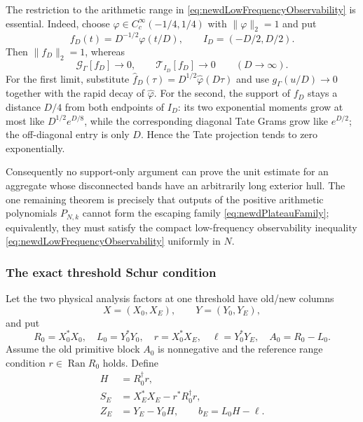 The restriction to the arithmetic range in
\eqref{eq:newdLowFrequencyObservability} is essential.  Indeed, choose
$\varphi\in C_c^\infty(-1/4,1/4)$ with $\|\varphi\|_2=1$ and put
\begin{equation}\label{eq:newdPlateauFamily}
 f_D(t)=D^{-1/2}\varphi(t/D),
 \qquad I_D=(-D/2,D/2).
\end{equation}
Then $\|f_D\|_2=1$, whereas
\begin{equation}\label{eq:newdPlateauEscape}
 \mathcal G_\Gamma[f_D]\longrightarrow0,
 \qquad
 \mathcal T_{I_D}[f_D]\longrightarrow0
 \qquad(D\to\infty).
\end{equation}
For the first limit, substitute
$\widehat f_D(\tau)=D^{1/2}\widehat\varphi(D\tau)$ and use
$g_\Gamma(u/D)\to0$ together with the rapid decay of
$\widehat\varphi$.  For the second, the support of $f_D$ stays a distance
$D/4$ from both endpoints of $I_D$: its two exponential moments grow at
most like $D^{1/2}e^{D/8}$, while the corresponding diagonal Tate Grams
grow like $e^{D/2}$; the off-diagonal entry is only $D$.  Hence the Tate
projection tends to zero exponentially.

Consequently no support-only argument can prove the unit estimate for an
aggregate whose disconnected bands have an arbitrarily long exterior
hull.  The one remaining theorem is precisely that
outputs of the positive arithmetic polynomials
$P_{N,k}$ cannot form the escaping family
\eqref{eq:newdPlateauFamily}; equivalently, they must satisfy the compact
low-frequency observability inequality
\eqref{eq:newdLowFrequencyObservability} uniformly in $N$.

\subsubsection{The exact threshold Schur condition}

Let the two physical analysis factors at one threshold have old/new columns
\[
 X=(X_0,X_E),\qquad Y=(Y_0,Y_E),
\]
and put
\begin{equation}\label{eq:newdPhysicalBlocks}
 R_0=X_0^*X_0,
 \quad L_0=Y_0^*Y_0,
 \quad r=X_0^*X_E,
 \quad \ell=Y_0^*Y_E,
 \quad A_0=R_0-L_0.
\end{equation}
Assume the old primitive block $A_0$ is nonnegative and the reference range
condition $r\in\operatorname{Ran}R_0$ holds.  Define
\begin{align}
 H&=R_0^\dagger r,
 \label{eq:newdReferenceLift}\\
 S_E&=X_E^*X_E-r^*R_0^\dagger r,
 \label{eq:newdReferenceSchur}\\
 Z_E&=Y_E-Y_0H,
 \qquad
 b_E=L_0H-\ell.
 \label{eq:newdOppositeResidual}
\end{align}

